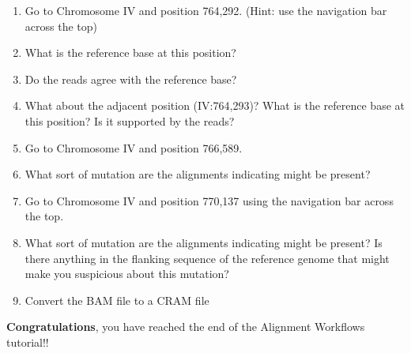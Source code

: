 \documentclass[11pt]{article}
\begin{document}
\begin{enumerate}
\def\labelenumi{\arabic{enumi}.}
\item
  Go to Chromosome IV and position 764,292. (Hint: use the
  navigation bar across the top)
\item
  What is the reference base at this position?
\item
  Do the reads agree with the reference base?
\item
  What about the adjacent position (IV:764,293)? What is the reference
  base at this position? Is it supported by the reads?
\item
  Go to Chromosome IV and position 766,589.
\item
  What sort of mutation are the alignments indicating might be present?
\item
  Go to Chromosome IV and position 770,137 using the navigation bar
  across the top.
\item
  What sort of mutation are the alignments indicating might be present?
  Is there anything in the flanking sequence of the reference genome
  that might make you suspicious about this mutation?
\item
  Convert the BAM file to a CRAM file
\end{enumerate}

    \textbf{Congratulations}, you have reached the end of the Alignment Workflows tutorial!!


\end{document}
